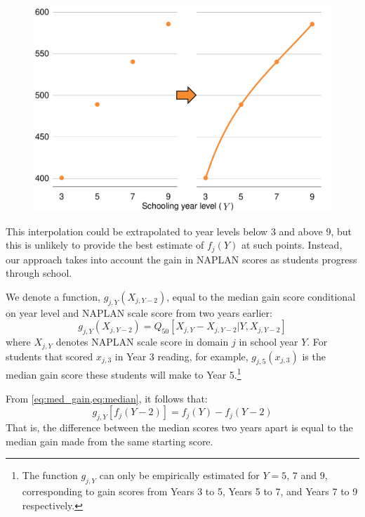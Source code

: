 \begin{figure}[t]
 \includegraphics[width=\columnwidth]{atlas/Interpolation.pdf}\label{fig:interpolation}

\end{figure}

This interpolation could be extrapolated to year levels below 3 and above 9, but this is unlikely to provide the best estimate of $f_{j}(Y)$ at such points. Instead, our approach takes into account the gain in NAPLAN scores as students progress through school.

We denote a function, $g_{j,Y}\left(X_{j,Y-2} \right)$, equal to the median gain score conditional on year level and NAPLAN scale score from two years earlier:
\begin{equation}
g_{j,Y}\left(X_{j,Y-2} \right) = Q_{50}\left[X_{j,Y}-X_{j,Y-2} | Y, X_{j,Y-2} \right] \label{eq:med_gain}
\end{equation}
where $X_{j,Y}$ denotes NAPLAN scale score in domain $j$ in school year $Y$. For students that scored $x_{j,3}$ in Year 3 reading, for example, $g_{j,5}(x_{j,3})$ is the median gain score these students will make to Year 5.\footnote{The function $g_{j,Y}$ can only be empirically estimated for $Y=5$, $7$ and $9$, corresponding to gain scores from Years 3 to 5, Years 5 to 7, and Years 7 to 9 respectively.}   

From \cref{eq:med_gain,eq:median}, it follows that:
\begin{equation} 
g_{j,Y}\left[f_{j}(Y-2)\right] = f_{j}(Y) - f_{j}(Y-2) \label{eq:gf}
\end{equation}
That is, the difference between the median scores two years apart is equal to the median gain made from the same starting score.

